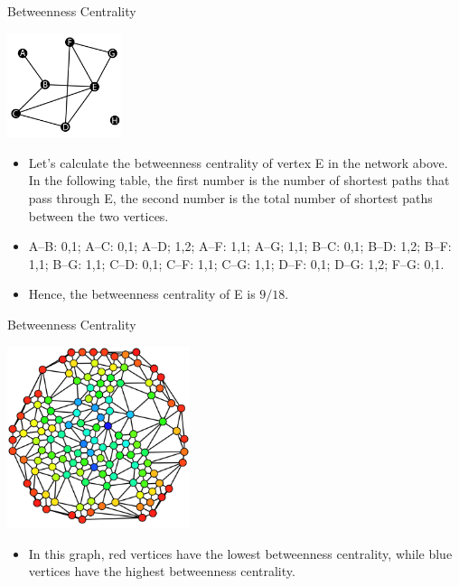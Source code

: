 \documentclass[9pt,handout]{beamer}
\let\olditem\item
\renewcommand{\item}{\olditem\vfill}
\begin{document}
\begin{frame}{Betweenness Centrality}
  \begin{center}
    \includegraphics[width=0.25\textwidth]{week_02_lecture_img_01}
  \end{center}    
  \begin{itemize}
    \item Let's calculate the betweenness centrality of vertex E in the network above. In the following table, the first number is the number of shortest paths that pass through E, the second number is the total number of shortest paths between the two vertices.
    \item A--B: 0,1; A--C: 0,1; A--D; 1,2; A--F: 1,1; A--G; 1,1; B--C: 0,1; B--D: 1,2; B--F: 1,1; B--G: 1,1; C--D: 0,1; C--F: 1,1; C--G: 1,1; D--F: 0,1; D--G: 1,2; F--G: 0,1. 
    \item Hence, the betweenness centrality of E is $9/18$.  
  \end{itemize}
\end{frame}

\begin{frame}{Betweenness Centrality}
  \begin{center}
    \includegraphics[width=0.4\textwidth]{week_02_lecture_img_02}
  \end{center}    
  \begin{itemize}
    \item In this graph, red vertices have the lowest betweenness centrality, while blue vertices have the highest betweenness centrality.
  \end{itemize}
\end{frame}
\end{document}
